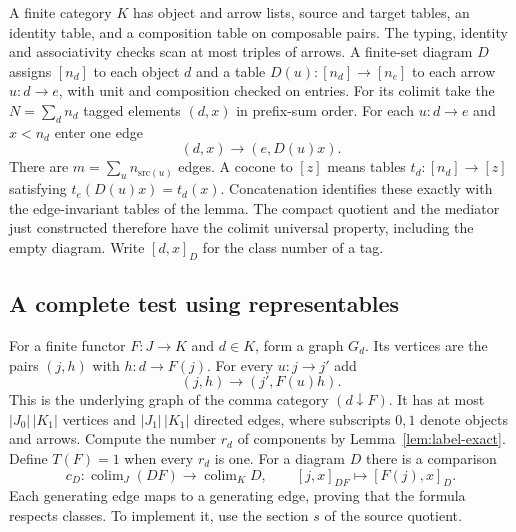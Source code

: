 A finite category $K$ has object and arrow lists, source and target tables, an identity table, and a composition table on composable pairs. The typing, identity and associativity checks scan at most triples of arrows. A finite-set diagram $D$ assigns $[n_d]$ to each object $d$ and a table $D(u):[n_d]\to[n_e]$ to each arrow $u:d\to e$, with unit and composition checked on entries. For its colimit take the $N=\sum_d n_d$ tagged elements $(d,x)$ in prefix-sum order. For each $u:d\to e$ and $x<n_d$ enter one edge
\[
 (d,x)\longrightarrow(e,D(u)x).
\]
There are $m=\sum_u n_{\mathrm{src}(u)}$ edges. A cocone to $[z]$ means tables $t_d:[n_d]\to[z]$ satisfying $t_e(D(u)x)=t_d(x)$. Concatenation identifies these exactly with the edge-invariant tables of the lemma. The compact quotient and the mediator just constructed therefore have the colimit universal property, including the empty diagram. Write $[d,x]_D$ for the class number of a tag.

\subsection{A complete test using representables}

For a finite functor $F:J\to K$ and $d\in K$, form a graph $G_d$. Its vertices are the pairs $(j,h)$ with $h:d\to F(j)$. For every $u:j\to j'$ add
\[
 (j,h)\longrightarrow (j',F(u)h).
\]
This is the underlying graph of the comma category $(d\mathbin\downarrow F)$. It has at most $|J_0|\,|K_1|$ vertices and $|J_1|\,|K_1|$ directed edges, where subscripts $0,1$ denote objects and arrows. Compute the number $r_d$ of components by Lemma~\ref{lem:label-exact}. Define $T(F)=1$ when every $r_d$ is one. For a diagram $D$ there is a comparison
\[
 c_D:\operatorname{colim}_{J}(DF)\longrightarrow\operatorname{colim}_{K}D,
 \qquad [j,x]_{DF}\longmapsto [F(j),x]_D .
\]
Each generating edge maps to a generating edge, proving that the formula respects classes. To implement it, use the section $s$ of the source quotient.

